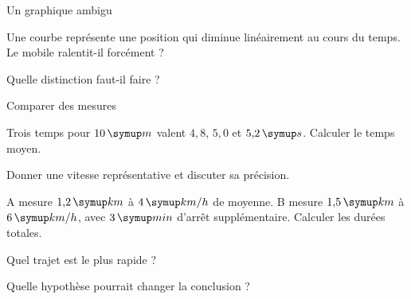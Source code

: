 \par\noindent\begin{minipage}{\linewidth}
\begin{exercice}[3]{Un graphique ambigu}
\begin{questions}
\item Une courbe représente une position qui diminue linéairement au cours du temps. Le mobile ralentit-il forcément ?
\item Quelle distinction faut-il faire ?
\end{questions}
\end{exercice}
\end{minipage}
\par\noindent\begin{minipage}{\linewidth}
\begin{exercice}[3]{Comparer des mesures}
\begin{questions}
\item Trois temps pour $10\unite m$ valent $4{,}8$, $5{,}0$ et $5{,}2\unite s$. Calculer le temps moyen.
\item Donner une vitesse représentative et discuter sa précision.
\end{questions}
\end{exercice}
\end{minipage}
\label{defi-ex-8}
\begin{questions}
\item A mesure $1{,}2\unite{km}$ à $4\unite{km/h}$ de moyenne. B mesure $1{,}5\unite{km}$ à $6\unite{km/h}$, avec $3\unite{min}$ d’arrêt supplémentaire. Calculer les durées totales.
\item Quel trajet est le plus rapide ?
\item Quelle hypothèse pourrait changer la conclusion ?
\end{questions}
\pcGrille
